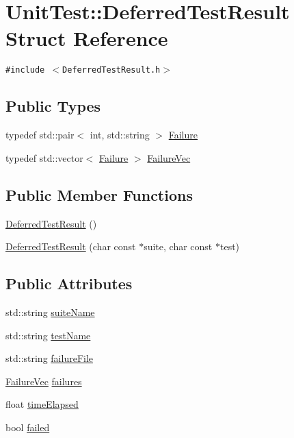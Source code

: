 \hypertarget{struct_unit_test_1_1_deferred_test_result}{
\section{UnitTest::DeferredTestResult Struct Reference}
\label{struct_unit_test_1_1_deferred_test_result}
}
{\tt \#include $<$DeferredTestResult.h$>$}

\subsection*{Public Types}
\begin{CompactItemize}
\item 
typedef std::pair$<$ int, std::string $>$ \hyperlink{struct_unit_test_1_1_deferred_test_result_9f60e64f7c34781b4ea43114bdb5aaf8}{Failure}
\item 
typedef std::vector$<$ \hyperlink{struct_unit_test_1_1_deferred_test_result_9f60e64f7c34781b4ea43114bdb5aaf8}{Failure} $>$ \hyperlink{struct_unit_test_1_1_deferred_test_result_48bb871ebaf048316581941194b2f887}{FailureVec}
\end{CompactItemize}
\subsection*{Public Member Functions}
\begin{CompactItemize}
\item 
\hyperlink{struct_unit_test_1_1_deferred_test_result_a9176ae2d6884ac31861638ad3c2eb56}{DeferredTestResult} ()
\item 
\hyperlink{struct_unit_test_1_1_deferred_test_result_6b047fe986a44af3b966df4495f62f8f}{DeferredTestResult} (char const $\ast$suite, char const $\ast$test)
\end{CompactItemize}
\subsection*{Public Attributes}
\begin{CompactItemize}
\item 
std::string \hyperlink{struct_unit_test_1_1_deferred_test_result_d9c83c05fb8c2d81753ed5e765db0bc3}{suiteName}
\item 
std::string \hyperlink{struct_unit_test_1_1_deferred_test_result_2e491a75905c60c3c3b1022060a5a1f0}{testName}
\item 
std::string \hyperlink{struct_unit_test_1_1_deferred_test_result_191bbff9b19585cee1b87f7e56311da9}{failureFile}
\item 
\hyperlink{struct_unit_test_1_1_deferred_test_result_48bb871ebaf048316581941194b2f887}{FailureVec} \hyperlink{struct_unit_test_1_1_deferred_test_result_39042498a0a8bbba2817cf97978b8c91}{failures}
\item 
float \hyperlink{struct_unit_test_1_1_deferred_test_result_09cb77930cd0ee30c05118bfebb27f51}{timeElapsed}
\item 
bool \hyperlink{struct_unit_test_1_1_deferred_test_result_29d12313c586cc950f8a36e0b742124f}{failed}
\end{CompactItemize}


